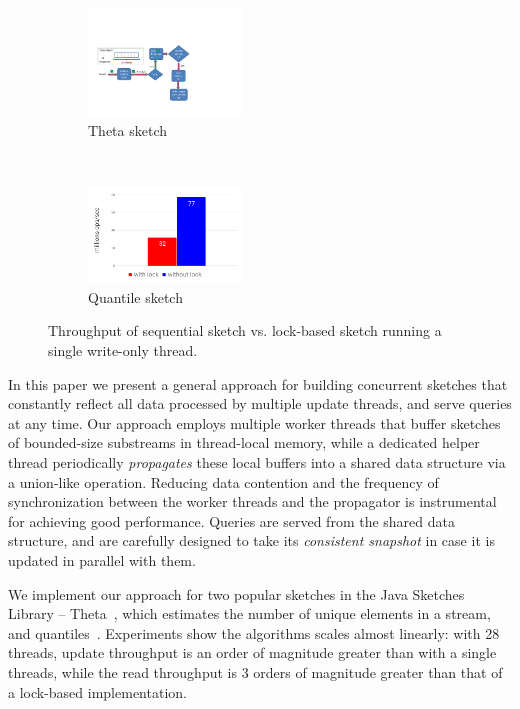 \begin{figure}[t!]
    \centering
    \begin{subfigure}[t]{0.49\columnwidth}
       \centering
        \includegraphics[width=1.6in]{images/seqTheta}
        \caption{Theta sketch}
        \label{fig:LockIsBadTheta}
    \end{subfigure}%
    ~ 

    \begin{subfigure}[t]{0.49\columnwidth}
        \centering
        \includegraphics[width=1.6in]{images/seqQuantiles}
        \caption{Quantile sketch}
        \label{fig:LockIsBadQuantiles}
    \end{subfigure}
    \caption{Throughput of sequential sketch vs. lock-based sketch running a single write-only thread.}
    \label{fig:lockBased}
\end{figure}



In this paper 
we present a general approach for building concurrent sketches that
constantly reflect all data processed by multiple update threads, 
and serve queries at any time. %
Our  approach employs multiple worker threads that buffer sketches of bounded-size substreams in thread-local memory, while a dedicated helper thread 
periodically \emph{propagates} these local buffers into a shared data structure via a union-like operation.
 Reducing data contention and the frequency of synchronization between the worker threads and the propagator is instrumental for achieving good performance. Queries are served from the shared data structure, and are carefully 
 designed to take its \emph{consistent snapshot} in case it is updated in parallel with them.

We implement our approach for two popular sketches in the Java Sketches Library -- Theta~\cite{Theta},
which estimates the number of unique elements in a stream, and quantiles~\cite{quantiles}.
Experiments show the algorithms scales almost linearly: with 28 threads, update throughput is an order of magnitude greater than with a single threads, while the 
read throughput is 3 orders of magnitude greater than that of a lock-based implementation.  


 
